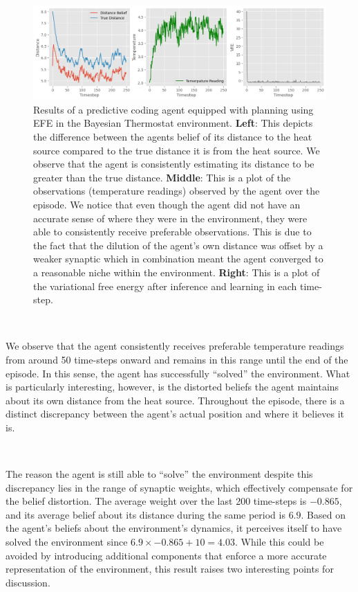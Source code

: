 \documentclass{article}
\begin{document}
\begin{figure}[htbp]
	\centering
	\includegraphics[scale=0.5]{images/pc_example_planning.png}
	\caption{Results of a predictive coding agent equipped with planning using EFE in the Bayesian Thermostat environment. \textbf{Left}: This depicts the difference between the agents belief of its distance to the heat source compared to the true distance it is from the heat source. We observe that the agent is consistently estimating its distance to be greater than the true distance. \textbf{Middle}: This is a plot of the observations (temperature readings) observed by the agent over the episode. We notice that even though the agent did not have an accurate sense of where they were in the environment, they were able to consistently receive preferable observations. This is due to the fact that the dilution of the agent's own distance was offset by a weaker synaptic which in combination meant the agent converged to a reasonable niche within the environment. \textbf{Right}: This is a plot of the variational free energy after inference and learning in each time-step.}
	\label{fig:pc_example_planning}
\end{figure}

\

We observe that the agent consistently receives preferable temperature readings from around 50 time-steps onward and remains in this range until the end of the episode. In this sense, the agent has successfully ``solved'' the environment. What is particularly interesting, however, is the distorted beliefs the agent maintains about its own distance from the heat source. Throughout the episode, there is a distinct discrepancy between the agent's actual position and where it believes it is.

\

The reason the agent is still able to ``solve'' the environment despite this discrepancy lies in the range of synaptic weights, which effectively compensate for the belief distortion. The average weight over the last 200 time-steps is $-0.865$, and its average belief about its distance during the same period is $6.9$. Based on the agent's beliefs about the environment's dynamics, it perceives itself to have solved the environment since $6.9 \times -0.865 + 10 = 4.03$. While this could be avoided by introducing additional components that enforce a more accurate representation of the environment, this result raises two interesting points for discussion.
\end{document}
